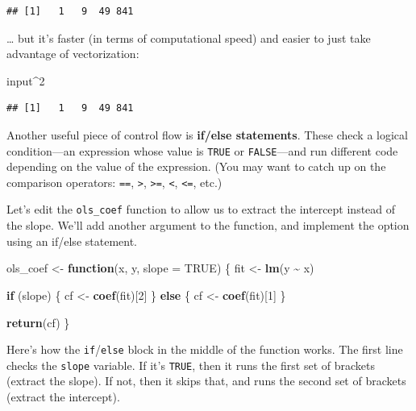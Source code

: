 \documentclass[
  12pt,
  oneside,openany]{book}
\newenvironment{Shaded}{\begin{snugshade}}{\end{snugshade}}
\newcommand{\ControlFlowTok}[1]{\textcolor[rgb]{0.13,0.29,0.53}{\textbf{#1}}}
\newcommand{\DataTypeTok}[1]{\textcolor[rgb]{0.13,0.29,0.53}{#1}}
\newcommand{\DecValTok}[1]{\textcolor[rgb]{0.00,0.00,0.81}{#1}}
\newcommand{\KeywordTok}[1]{\textcolor[rgb]{0.13,0.29,0.53}{\textbf{#1}}}
\newcommand{\NormalTok}[1]{#1}
\newcommand{\OperatorTok}[1]{\textcolor[rgb]{0.81,0.36,0.00}{\textbf{#1}}}
\newcommand{\OtherTok}[1]{\textcolor[rgb]{0.56,0.35,0.01}{#1}}
\newcommand{\StringTok}[1]{\textcolor[rgb]{0.31,0.60,0.02}{#1}}
\begin{document}
\begin{verbatim}
## [1]   1   9  49 841
\end{verbatim}

\ldots{} but it's faster (in terms of computational speed) and easier to just take advantage of vectorization:

\begin{Shaded}
\begin{Highlighting}[]
\NormalTok{input}\OperatorTok{\^{}}\DecValTok{2}
\end{Highlighting}
\end{Shaded}

\begin{verbatim}
## [1]   1   9  49 841
\end{verbatim}

Another useful piece of control flow is \textbf{if/else statements}. These check a logical condition---an expression whose value is \texttt{TRUE} or \texttt{FALSE}---and run different code depending on the value of the expression. (You may want to catch up on the comparison operators: \texttt{==}, \texttt{\textgreater{}}, \texttt{\textgreater{}=}, \texttt{\textless{}}, \texttt{\textless{}=}, etc.)

Let's edit the \texttt{ols\_coef} function to allow us to extract the intercept instead of the slope. We'll add another argument to the function, and implement the option using an if/else statement.

\begin{Shaded}
\begin{Highlighting}[]
\NormalTok{ols\_coef \textless{}{-}}\StringTok{ }\ControlFlowTok{function}\NormalTok{(x, y, }\DataTypeTok{slope =} \OtherTok{TRUE}\NormalTok{) \{}
\NormalTok{  fit \textless{}{-}}\StringTok{ }\KeywordTok{lm}\NormalTok{(y }\OperatorTok{\textasciitilde{}}\StringTok{ }\NormalTok{x)}

  \ControlFlowTok{if}\NormalTok{ (slope) \{}
\NormalTok{    cf \textless{}{-}}\StringTok{ }\KeywordTok{coef}\NormalTok{(fit)[}\DecValTok{2}\NormalTok{]}
\NormalTok{  \} }\ControlFlowTok{else}\NormalTok{ \{}
\NormalTok{    cf \textless{}{-}}\StringTok{ }\KeywordTok{coef}\NormalTok{(fit)[}\DecValTok{1}\NormalTok{]}
\NormalTok{  \}}

  \KeywordTok{return}\NormalTok{(cf)}
\NormalTok{\}}
\end{Highlighting}
\end{Shaded}

Here's how the \texttt{if}/\texttt{else} block in the middle of the function works.
The first line checks the \texttt{slope} variable.
If it's \texttt{TRUE}, then it runs the first set of brackets (extract the slope).
If not, then it skips that, and runs the second set of brackets (extract the intercept).
\end{document}
